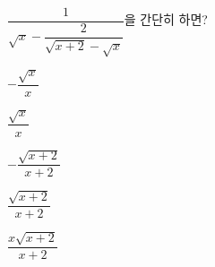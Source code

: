 \hspace*{2mm}\begin{minipage}[t]{\dimexpr\linewidth-2mm\relax}\vspace{0pt}
$\dfrac{1}{\sqrt{x}-\dfrac{2}{\sqrt{x+2}-\sqrt{x}}}$을 간단히 하면?
\begin{choices32}{\rule[-3ex]{0pt}{8ex}$-\dfrac{\sqrt{x}}{x}$}{\rule[-3ex]{0pt}{8ex}$\dfrac{\sqrt{x}}{x}$}{\rule[-3ex]{0pt}{8ex}$-\dfrac{\sqrt{x+2}}{x+2}$}{\rule[-3ex]{0pt}{8ex}$\dfrac{\sqrt{x+2}}{x+2}$}{\rule[-3ex]{0pt}{8ex}$\dfrac{x\sqrt{x+2}}{x+2}$}\end{choices32}\end{minipage}
